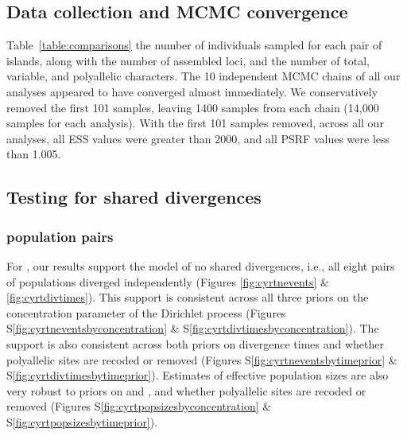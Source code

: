 \subsection{Data collection and MCMC convergence}
Table~\ref{table:comparisons}  the number of individuals sampled for
each pair of islands, along with the number of assembled loci, and the number
of total, variable, and polyallelic characters.
The 10 independent MCMC chains of all our \ecoevolity analyses appeared to have
converged almost immediately.
We conservatively removed the first 101 samples, leaving 1400 samples from each
chain (14,000 samples for each analysis).
With the first 101 samples removed, across all our analyses, all ESS values
were greater than 2000, and all PSRF values were less than 1.005.

\subsection{Testing for shared divergences}

\subsubsection{ population pairs}
For , our \ecoevolity results support the model of no shared
divergences, i.e., all eight pairs of populations diverged independently
(Figures \ref{fig:cyrtnevents} \& \ref{fig:cyrtdivtimes}).
This support is consistent across all three priors on the concentration
parameter of the Dirichlet process
(Figures
S\ref{fig:cyrtneventsbyconcentration}
\&
S\ref{fig:cyrtdivtimesbyconcentration}).
The support is also consistent across both priors on divergence times
and whether polyallelic sites are recoded or removed
(Figures
S\ref{fig:cyrtneventsbytimeprior}
\&
S\ref{fig:cyrtdivtimesbytimeprior}).
Estimates of effective population sizes are also very robust to
priors on \concentration and \divtime, and whether polyallelic sites
are recoded or removed
(Figures
S\ref{fig:cyrtpopsizesbyconcentration}
\&
S\ref{fig:cyrtpopsizesbytimeprior}).

\ifembed{

}{}

\ifembed{

}{}

